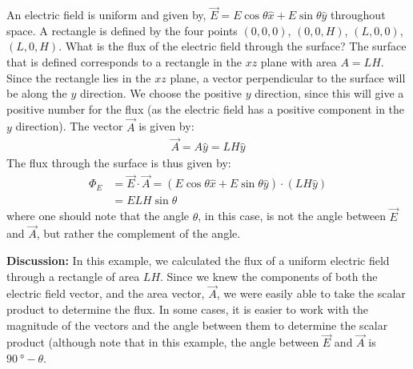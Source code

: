 \begin{example}{An electric field is uniform and given by, $\vec E=E\cos\theta\hat x+E\sin\theta\hat y $ throughout space. A rectangle is defined by the four points $(0,0,0)$, $(0,0,H)$, $(L,0,0)$, $(L,0,H)$. What is the flux of the electric field through the surface?}
The surface that is defined corresponds to a rectangle in the $xz$ plane with area $A=LH$. Since the rectangle lies in the $xz$ plane, a vector perpendicular to the surface will be along the $y$ direction. We choose the positive $y$ direction, since this will give a positive number for the flux (as the electric field has a positive component in the $y$ direction). The vector $\vec A$ is given by:
\begin{align*}
\vec A =A\hat y=LH\hat y
\end{align*}
The flux through the surface is thus given by:
\begin{align*}
\Phi_E&=\vec E\cdot \vec A=(E\cos\theta\hat x+E\sin\theta\hat y)\cdot(LH\hat y)\\
&=ELH\sin\theta
\end{align*}
where one should note that the angle $\theta$, in this case, is not the angle between $\vec E$ and $\vec A$, but rather the complement of the angle. 

\textbf{Discussion:} In this example, we calculated the flux of a uniform electric field through a rectangle of area $LH$. Since we knew the components of both the electric field vector, and the area vector, $\vec A$, we were easily able to take the scalar product to determine the flux. In some cases, it is easier to work with the magnitude of the vectors and the angle between them to determine the scalar product (although note that in this example, the angle between $\vec E$ and $\vec A$ is $\SI{90}{\degree}-\theta$.
\end{example}


